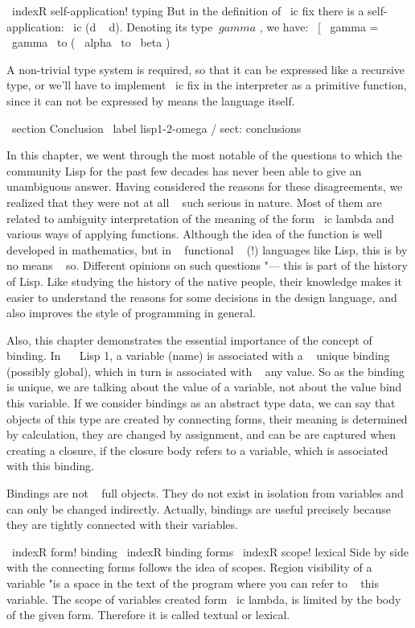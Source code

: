 {\ indexR {self-application! typing}
But in the definition of \ ic {fix} there is a self-application: \ ic {(d ~ d)}. Denoting its type
$ \ gamma $ , we have:
%
\ [  \ gamma = \ gamma  \ to ( \ alpha  \ to  \ beta ) \]

A non-trivial type system is required, so that it can be expressed
like a recursive type, or we'll have to implement \ ic {fix}
in the interpreter as a primitive function, since it can not be expressed by means
the language itself.


\ section {Conclusion} \ label {lisp1-2-omega / sect: conclusions}

In this chapter, we went through the most notable of the questions to which the community
Lisp for the past few decades has never been able to give an unambiguous
answer. Having considered the reasons for these disagreements, we realized that they were not at all ~ such
serious in nature. Most of them are related to ambiguity
interpretation of the meaning of the form \ ic {lambda} and various ways of applying functions.
Although the idea of ​​the function is well developed in mathematics, but
in ~ functional ~ (!) languages ​​like Lisp, this is by no means ~ so. Different opinions on
such questions "--- this is part of the history of Lisp. Like studying the history of the native
people, their knowledge makes it easier to understand the reasons for some decisions in the design
language, and also improves the style of programming in general.

Also, this chapter demonstrates the essential importance of the concept of binding.
In ~ \ Lisp 1, a variable (name) is associated with a ~ unique binding (possibly
global), which in turn is associated with ~ any value. So
as the binding is unique, we are talking about the value of a variable, not about the value
bind this variable. If we consider bindings as an abstract type
data, we can say that objects of this type are created by connecting forms,
their meaning is determined by calculation, they are changed by assignment, and can be
are captured when creating a closure, if the closure body refers to a variable,
which is associated with this binding.

Bindings are not ~ full objects. They do not exist in isolation from
variables and can only be changed indirectly. Actually, bindings are useful
precisely because they are tightly connected with their variables.

\ indexR {form! binding}
\ indexR {binding forms}
\ indexR {scope! lexical}
Side by side with the connecting forms follows the idea of ​​scopes. Region
visibility of a variable "is a space in the text of the program where you can
refer to ~ this variable. The scope of variables created
form \ ic {lambda}, is limited by the body of the given form. Therefore it is called
textual or lexical.

}
